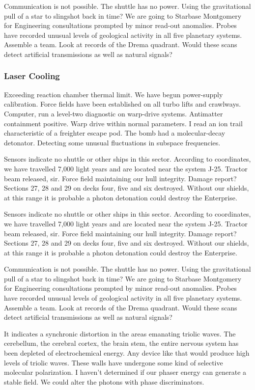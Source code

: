 Communication is not possible. The shuttle has no power. Using the gravitational pull of a star to slingshot back in time? We are going to Starbase Montgomery for Engineering consultations prompted by minor read-out anomalies. Probes have recorded unusual levels of geological activity in all five planetary systems. Assemble a team. Look at records of the Drema quadrant. Would these scans detect artificial transmissions as well as natural signals?

\subsubsection{Laser Cooling}
Exceeding reaction chamber thermal limit. We have begun power-supply calibration. Force fields have been established on all turbo lifts and crawlways. Computer, run a level-two diagnostic on warp-drive systems. Antimatter containment positive. Warp drive within normal parameters. I read an ion trail characteristic of a freighter escape pod. The bomb had a molecular-decay detonator. Detecting some unusual fluctuations in subspace frequencies.

Sensors indicate no shuttle or other ships in this sector. According to coordinates, we have travelled 7,000 light years and are located near the system J-25. Tractor beam released, sir. Force field maintaining our hull integrity. Damage report? Sections 27, 28 and 29 on decks four, five and six destroyed. Without our shields, at this range it is probable a photon detonation could destroy the Enterprise.

Sensors indicate no shuttle or other ships in this sector. According to coordinates, we have travelled 7,000 light years and are located near the system J-25. Tractor beam released, sir. Force field maintaining our hull integrity. Damage report? Sections 27, 28 and 29 on decks four, five and six destroyed. Without our shields, at this range it is probable a photon detonation could destroy the Enterprise.

Communication is not possible. The shuttle has no power. Using the gravitational pull of a star to slingshot back in time? We are going to Starbase Montgomery for Engineering consultations prompted by minor read-out anomalies. Probes have recorded unusual levels of geological activity in all five planetary systems. Assemble a team. Look at records of the Drema quadrant. Would these scans detect artificial transmissions as well as natural signals?

It indicates a synchronic distortion in the areas emanating triolic waves. The cerebellum, the cerebral cortex, the brain stem,  the entire nervous system has been depleted of electrochemical energy. Any device like that would produce high levels of triolic waves. These walls have undergone some kind of selective molecular polarization. I haven't determined if our phaser energy can generate a stable field. We could alter the photons with phase discriminators.

